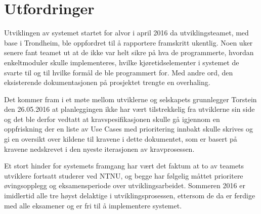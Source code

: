 \chapter{Utfordringer}
\setlength{\parindent}{2ex}
Utviklingen av systemet startet for alvor i april 2016 da utviklingsteamet, med base i Trondheim, ble oppfordret til å rapportere framskritt ukentlig. Noen uker senere fant teamet ut at de ikke var helt sikre på hva de programmerte, hvordan enkeltmoduler skulle implementeres, hvilke kjøretidselementer i systemet de svarte til og til hvilke formål de ble programmert for. Med andre ord, den eksisterende dokumentasjonen på prosjektet trengte en overhaling.\par
Det kommer fram i et møte mellom utviklerne og selskapets grunnlegger Torstein den 26.05.2016 at planleggingen ikke har vært tilstrekkelig fra utviklerne sin side og det ble derfor vedtatt at kravspesifikasjonen skulle gå igjennom en oppfriskning der en liste av Use Cases med prioritering innbakt skulle skrives og gi en oversikt over kildene til kravene i dette dokumentet,  som er basert på kravene nedskrevet i den nyeste iterasjonen av kravprosessen.\par
Et stort hinder for systemets framgang har vært det faktum at to av teamets utviklere fortsatt studerer ved NTNU, og begge har følgelig måttet prioritere øvingsopplegg og eksamensperiode over utviklingsarbeidet. Sommeren 2016 er imidlertid alle tre høyst delaktige i utviklingsprosessen, ettersom de da er ferdige med alle eksamener og er fri til å implementere systemet.
